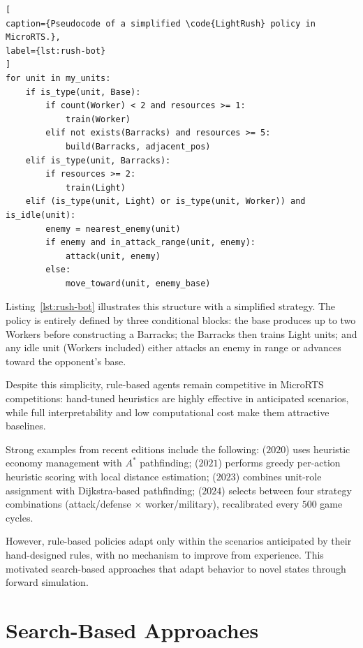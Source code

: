 \begin{lstlisting}[
caption={Pseudocode of a simplified \code{LightRush} policy in MicroRTS.},
label={lst:rush-bot}
]
for unit in my_units:
    if is_type(unit, Base):
        if count(Worker) < 2 and resources >= 1:
            train(Worker)
        elif not exists(Barracks) and resources >= 5:
            build(Barracks, adjacent_pos)
    elif is_type(unit, Barracks):
        if resources >= 2:
            train(Light)
    elif (is_type(unit, Light) or is_type(unit, Worker)) and is_idle(unit):
        enemy = nearest_enemy(unit)
        if enemy and in_attack_range(unit, enemy):
            attack(unit, enemy)
        else:
            move_toward(unit, enemy_base)
\end{lstlisting}

Listing~\ref{lst:rush-bot} illustrates this structure with a simplified  strategy. The policy is entirely defined by three conditional blocks: the base produces up to two Workers before constructing a Barracks; the Barracks then trains Light units; and any idle unit (Workers included) either attacks an enemy in range or advances toward the opponent's base.

Despite this simplicity, rule-based agents remain competitive in MicroRTS competitions: hand-tuned heuristics are highly effective in anticipated scenarios, while full interpretability and low computational cost make them attractive baselines.

Strong examples from recent editions include the following:  ($2020$) uses heuristic economy management with $A^{*}$ pathfinding;  ($2021$) performs greedy per-action heuristic scoring with local distance estimation;  ($2023$) combines unit-role assignment with Dijkstra-based pathfinding;  ($2024$) selects between four strategy combinations (attack/defense $\times$ worker/military), recalibrated every $500$ game cycles.

However, rule-based policies adapt only within the scenarios 
anticipated by their hand-designed rules, with no mechanism to improve from experience. This motivated search-based approaches that adapt behavior to novel states through forward simulation.

\section{Search-Based Approaches}
\label{sec:search-based}

